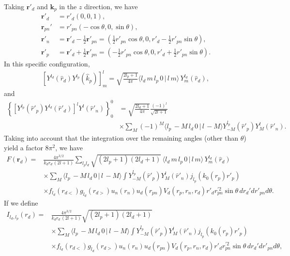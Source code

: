 \documentclass[a4paper,11pt]{article}
\begin{document}
Taking $\mathbf r'_d$ and $\mathbf k_p$ in the $z$ direction, we have
\begin{align}\label{eq43}
\nonumber\mathbf r'_d&=r'_d\left(0,0,1\right),\\
\nonumber\mathbf r_{pn}'&=r'_{pn}\left(-\cos\theta,0,\sin\theta\right),\\
\nonumber \mathbf r'_{n}&=\mathbf r'_d-\frac{1}{2}\mathbf r'_{pn}=\left(\frac{1}{2}r'_{pn}\cos\theta,0,r'_d-\frac{1}{2}r'_{pn}\sin\theta\right),\\
 \mathbf r'_{p}&=\mathbf r'_d+\frac{1}{2}\mathbf r'_{pn}=\left(-\frac{1}{2}r'_{pn}\cos\theta,0,r'_d+\frac{1}{2}r'_{pn}\sin\theta\right).
\end{align}
In this specific configuration,
 \begin{align}\label{eq72}
\left[Y^{l_d}(\hat r_d) Y^{l_p}(\hat k_p)\right]^l_m=\sqrt{\frac{2l_p+1}{4\pi}}\langle l_d\,m\,l_p\,0\,|\,l\,m\rangle \,Y^{l_d}_m(\hat r_d),
 \end{align}
 and
  \begin{align}\label{eq73}
  \nonumber \left\{\left[Y^{l_p}(\hat r'_p)Y^{l_d}(\hat r'_d)\right]^lY^l(\hat r'_n)\right\}^0_0&=\sqrt{\frac{2l_d+1}{4\pi}}\frac{(-1)^{l}}{\sqrt{2l+1}}\\
  &\times\sum_{M}(-1)^M\langle l_p\,-M\,l_d\,0\,|\,l\,-M\rangle    Y^{l_p}_{-M}(\hat r'_p)Y^{l}_{M}(\hat r'_n).
  \end{align}
  Taking into account that the integration over the remaining angles (other than $\theta$) yield a factor $8\pi^2$, we have
 \begin{align}\label{eq74}
 \nonumber F(\mathbf r_d)=&\frac{4\pi^{3/2}}{k_dr_d\,(2l+1)}\sum_{l_pl_d}\sqrt{(2l_p+1)(2l_d+1)}\,\langle l_d\,m\,l_p\,0\,|\,l\,m\rangle\,Y^{l_d}_m(\hat r_d)\\
 \nonumber&\times\sum_{M}\langle l_p\,-M\,l_d\,0\,|\,l\,-M\rangle  \int  Y^{l_p}_{-M}(\hat r'_p)Y^{l}_{M}(\hat r'_n)j_{l_p}(k_0(r_p) r'_p)\\
 &\times f_{l_d}(r_{d<})g_{l_d}(r_{d>})u_n(r_n)u_d(r_{pn}) V_{d}(r_{p},r_n,r_d) r'_dr_{pn}^{'2}\sin\theta\, d r_d'dr'_{pn}d\theta.
 \end{align}
 If we define
 \begin{align}\label{eq48}
\nonumber I_{l_d,l_p}(r_d)=&\frac{4\pi^{3/2}}{k_dr_d\,(2l+1)}\sqrt{(2l_p+1)(2l_d+1)}\\
\nonumber&\times\sum_{M}\langle l_p\,-M\,l_d\,0\,|\,l\,-M\rangle  \int  Y^{l_p}_{-M}(\hat r'_p)Y^{l}_{M}(\hat r'_n)j_{l_p}(k_0(r_p) r'_p)\\
&\times f_{l_d}(r_{d<})g_{l_d}(r_{d>})u_n(r_n)u_d(r_{pn}) V_{d}(r_{p},r_n,r_d) r'_dr_{pn}^{'2}\sin\theta\, d r_d'dr'_{pn}d\theta,
 \end{align}
\end{document}
